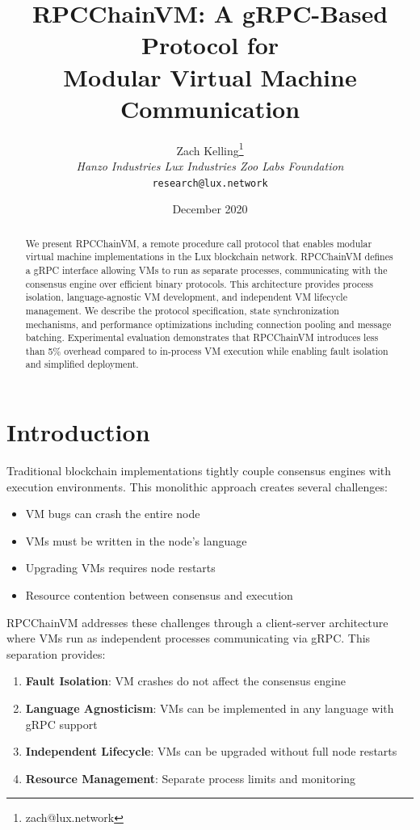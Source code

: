 \documentclass[11pt,letterpaper]{article}
\title{RPCChainVM: A gRPC-Based Protocol for\\Modular Virtual Machine Communication}
\author{Zach Kelling\thanks{zach@lux.network} \\ \textit{Hanzo Industries \quad Lux Industries \quad Zoo Labs Foundation} \\ \texttt{research@lux.network}}
\date{December 2020}
\begin{document}
\maketitle

\begin{abstract}
We present RPCChainVM, a remote procedure call protocol that enables modular virtual machine implementations in the Lux blockchain network. RPCChainVM defines a gRPC interface allowing VMs to run as separate processes, communicating with the consensus engine over efficient binary protocols. This architecture provides process isolation, language-agnostic VM development, and independent VM lifecycle management. We describe the protocol specification, state synchronization mechanisms, and performance optimizations including connection pooling and message batching. Experimental evaluation demonstrates that RPCChainVM introduces less than 5\% overhead compared to in-process VM execution while enabling fault isolation and simplified deployment.
\end{abstract}

\section{Introduction}

Traditional blockchain implementations tightly couple consensus engines with execution environments. This monolithic approach creates several challenges:

\begin{itemize}
    \item VM bugs can crash the entire node
    \item VMs must be written in the node's language
    \item Upgrading VMs requires node restarts
    \item Resource contention between consensus and execution
\end{itemize}

RPCChainVM addresses these challenges through a client-server architecture where VMs run as independent processes communicating via gRPC. This separation provides:

\begin{enumerate}
    \item \textbf{Fault Isolation}: VM crashes do not affect the consensus engine
    \item \textbf{Language Agnosticism}: VMs can be implemented in any language with gRPC support
    \item \textbf{Independent Lifecycle}: VMs can be upgraded without full node restarts
    \item \textbf{Resource Management}: Separate process limits and monitoring
\end{enumerate}
\end{document}
